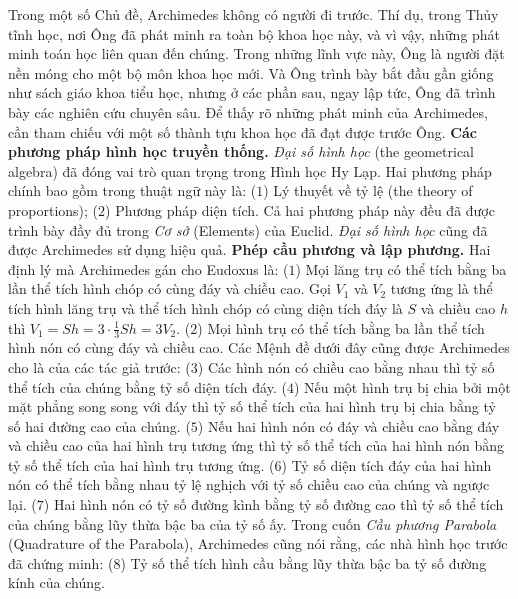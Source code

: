 \begin{multicols}{2}
	\vskip 0.1cm
	Trong một số Chủ đề, Archimedes không có người đi trước. Thí dụ, trong Thủy tĩnh học, nơi Ông đã phát minh ra toàn bộ khoa học này, và vì vậy, những phát minh toán học liên quan đến chúng. Trong những lĩnh vực này, Ông là người đặt nền móng cho một bộ môn khoa học mới. Và Ông trình bày bắt đầu gần giống như sách giáo khoa tiểu học, nhưng ở các phần sau, ngay lập tức, Ông đã trình bày các nghiên cứu chuyên sâu. 
	\vskip 0.1cm
	Để thấy rõ những phát minh của Archimedes, cần tham chiếu với một số thành tựu khoa học đã đạt được trước Ông.
	\vskip 0.1cm
	\textbf{\color{lichsutoanhoc}Các phương pháp hình học truyền thống.} \textit{Đại số hình học} (the geometrical algebra) đã đóng vai trò quan trọng trong Hình học Hy Lạp. Hai phương pháp chính bao gồm trong thuật ngữ này là: ($1$) Lý thuyết về tỷ lệ (the theory of proportions); ($2$) Phương pháp diện tích. Cả hai phương pháp này đều đã được trình bày đầy đủ trong \textit{Cơ sở} (Elements) của Euclid. \textit{Đại số hình học} cũng đã được Archimedes sử dụng hiệu quả. 
	\vskip 0.1cm
	\textbf{\color{lichsutoanhoc}Phép cầu phương và lập phương.} Hai định lý mà Archimedes gán cho Eudoxus là:
	\vskip 0.1cm
	($1$) Mọi lăng trụ có thể tích bằng ba lần thể tích hình chóp có cùng đáy và chiều cao. 
	\vskip 0.1cm
	Gọi  $V_1$ và $V_2$ tương ứng là thể tích hình lăng trụ và thể tích hình chóp có cùng diện tích đáy là $S$  và chiều cao $h$  thì $V_1 = Sh = 3\cdot\frac{1}{3}Sh = 3V_2$.
	\vskip 0.1cm 
	($2$) Mọi hình trụ có thể tích bằng ba lần thể tích hình nón có cùng đáy và chiều cao.
	\vskip 0.1cm
	Các Mệnh đề dưới đây cũng được Archimedes cho là của các tác giả trước:  
	\vskip 0.1cm
	($3$) Các hình nón có chiều cao bằng nhau thì tỷ số thể tích của chúng bằng tỷ số diện tích đáy.
	\vskip 0.1cm
	($4$) Nếu một hình trụ bị chia bởi một mặt phẳng song song với đáy thì tỷ số thể tích của hai hình trụ bị chia bằng tỷ số hai đường cao của chúng.
	\vskip 0.1cm
	($5$) Nếu hai hình nón có đáy và chiều cao bằng đáy và chiều cao của hai hình trụ tương ứng thì tỷ số thể tích của hai hình nón bằng tỷ số thể tích của hai hình trụ tương ứng.
	\vskip 0.1cm
	($6$) Tỷ số diện tích đáy của hai hình nón có thể tích bằng nhau tỷ lệ nghịch với tỷ số chiều cao của chúng và ngược lại. 
	\vskip 0.1cm
	($7$) Hai hình nón có tỷ số đường kình bằng tỷ số đường cao thì tỷ số thể tích của chúng bằng lũy thừa bậc ba của tỷ số ấy. 
	\vskip 0.1cm
	Trong cuốn \textit{Cầu phương Parabola} (Quadrature of the Parabola), Archimedes cũng nói rằng, các nhà hình học trước đã chứng minh:
	\vskip 0.1cm
	($8$) Tỷ số thể tích hình cầu bằng lũy thừa bậc ba tỷ số đường kính của chúng.

\end{multicols}
